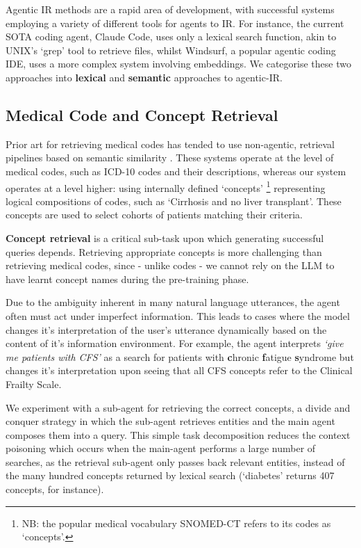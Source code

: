 \documentclass[11pt]{article}
\begin{document}
Agentic IR methods are a rapid area of development, with successful systems employing a variety of different tools for agents to IR.
For instance, the current SOTA coding agent, Claude Code, uses only a lexical search function, akin to UNIX's `grep' tool to retrieve files, whilst Windsurf, a popular agentic coding IDE, uses a more complex system involving embeddings. We categorise these two approaches into \textbf{lexical} and \textbf{semantic} approaches to agentic-IR.

\subsection{Medical Code and Concept Retrieval}
Prior art for retrieving medical codes has tended to use non-agentic, retrieval pipelines based on semantic similarity \citet{baksi_medcoder_2024, ziletti_retrieval_2024}.
These systems operate at the level of medical codes, such as ICD-10 codes and their descriptions, whereas our system operates at a level higher: using internally defined `concepts'
	\footnote{NB: the popular medical vocabulary SNOMED-CT refers to its codes as `concepts'.}
representing logical compositions of codes, such as `Cirrhosis and no liver transplant'.
These concepts are used to select cohorts of patients matching their criteria.

\textbf{Concept retrieval} is a critical sub-task upon which generating successful queries depends.
Retrieving appropriate concepts is more challenging than retrieving medical codes, since - unlike codes - we cannot rely on the LLM to have learnt concept names during the pre-training phase.

Due to the ambiguity inherent in many natural language utterances, the agent often must act under imperfect information.
This leads to cases where the model changes it's interpretation of the user's utterance dynamically based on the content of it's information environment.
For example, the agent interprets \textit{`give me patients with CFS'} as a search for patients with \textbf{c}hronic \textbf{f}atigue \textbf{s}yndrome but changes it's interpretation upon seeing that all CFS concepts refer to the Clinical Frailty Scale. 

We experiment with a sub-agent for retrieving the correct concepts, a divide and conquer strategy in which the sub-agent retrieves entities and the main agent composes them into a query.
This simple task decomposition reduces the context poisoning which occurs when the main-agent performs a large number of searches, as the retrieval sub-agent only passes back relevant entities, instead of the many hundred concepts returned by lexical search (`diabetes' returns 407 concepts, for instance).
\end{document}
